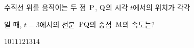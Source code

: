 수직선 위를 움직이는 두 점~$\mathrm{P}$, $\mathrm{Q}$의 시각 $t$에서의 위치가 각각 \par\smallskip{}\par\smallskip\noindent 일 때, $t=3$에서의 선분~$\mathrm{PQ}$의 중점~$\mathrm{M}$의 속도는?
\begin{choices32}{$10$}{$11$}{$12$}{$13$}{$14$}\end{choices32}
